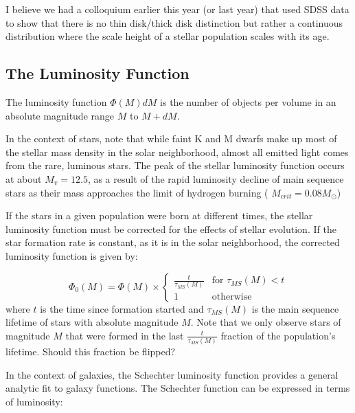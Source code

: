 I believe we had a colloquium earlier this year (or last year) that used SDSS data to show
that there is no thin disk/thick disk distinction but rather a continuous distribution
where the scale height of a stellar population scales with its age.

\subsection{The Luminosity Function}

The luminosity function $\Phi(M)dM$ is the number of objects per volume in an absolute magnitude range $M$ to $M+dM$. 

In the context of stars, note that while faint K and M dwarfs make up most of
the stellar mass density in the solar neighborhood, almost all emitted light
comes from the rare, luminous stars.
The peak of the stellar luminosity function occurs at about $M_v = 12.5$, as a result of the rapid luminosity decline of main sequence stars as their mass approaches the limit of hydrogen burning ( $M_{crit} = 0.08 M_\odot$)

If the stars in a given population were born at different times, the stellar luminosity function must be corrected for the effects of stellar evolution. If the star formation rate is constant, as it is in the solar neighborhood,  the corrected luminosity function is given by:

 \begin{equation}
\Phi_0(M) = \Phi(M) \times
\begin{cases}
\frac{t}{\tau_{MS}(M)} & \text{for } \tau_{MS}(M)<t \\
1 & \text{otherwise}
\end{cases}
\end{equation} 
where $t$ is the time since formation started and $\tau_{MS}(M)$ is the main
sequence lifetime of stars with absolute magnitude $M$. Note that we only
observe stars of magnitude $M$ that were formed in the last
$\frac{t}{\tau_{MS}(M)}$ fraction of the population's lifetime.  Should this 
fraction be flipped?

In the context of galaxies, the Schechter luminosity function provides a general analytic fit to galaxy functions. The Schechter function can be expressed in terms of luminosity:

